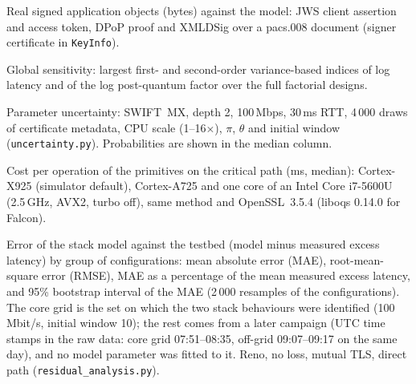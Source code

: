 \documentclass[11pt]{article}
\begin{document}
\begin{table}[!htbp]\centering\small
\caption{Real signed application objects (bytes) against the model: JWS client assertion and access token, DPoP proof and XMLDSig over a pacs.008 document (signer certificate in \texttt{KeyInfo}).}
\resizebox{\textwidth}{!}{}
\end{table}

\begin{table}[!htbp]\centering\small
\caption{Global sensitivity: largest first- and second-order variance-based indices of log latency and of the log post-quantum factor over the full factorial designs.}
\resizebox{\textwidth}{!}{}
\end{table}

\begin{table}[!htbp]\centering\small
\caption{Parameter uncertainty: SWIFT~MX, depth 2, 100\,Mbps, 30\,ms RTT, 4\,000 draws of certificate metadata, CPU scale (1--16$\times$), $\pi$, $\theta$ and initial window (\texttt{uncertainty.py}). Probabilities are shown in the median column.}

\end{table}

\begin{table}[!htbp]\centering\small
\caption{Cost per operation of the primitives on the critical path (ms, median): Cortex-X925 (simulator default), Cortex-A725 and one core of an Intel Core i7-5600U (2.5\,GHz, AVX2, turbo off), same method and OpenSSL~3.5.4 (liboqs 0.14.0 for Falcon).}

\end{table}

\begin{table}[!htbp]\centering\small
\caption{Error of the stack model against the testbed (model minus measured excess latency) by group of configurations: mean absolute error (MAE), root-mean-square error (RMSE), MAE as a percentage of the mean measured excess latency, and 95\% bootstrap interval of the MAE (2\,000 resamples of the configurations). The core grid is the set on which the two stack behaviours were identified (100\,Mbit/s, initial window 10); the rest comes from a later campaign (UTC time stamps in the raw data: core grid 07:51--08:35, off-grid 09:07--09:17 on the same day), and no model parameter was fitted to it. Reno, no loss, mutual TLS, direct path (\texttt{residual\_analysis.py}).}
\resizebox{\textwidth}{!}{}
\end{table}
\end{document}
